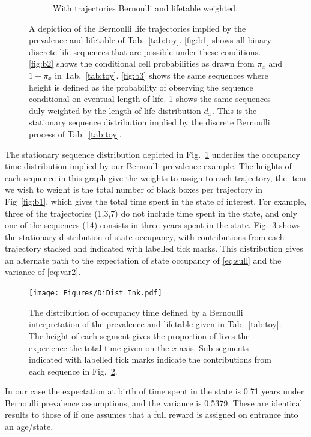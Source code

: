 \documentclass{bmcart}
\begin{document}
\begin{figure}
\begin{subfigure}[b]{0.4\textwidth}
        \caption{With trajectories Bernoulli and lifetable weighted.\\}
        \label{fig:b4}
    \end{subfigure}
    \caption{A depiction of the Bernoulli life trajectories implied by the prevalence and lifetable of Tab.~\ref{tab:toy}. \ref{fig:b1} shows all binary discrete life sequences that are possible under these conditions. \ref{fig:b2} shows the conditional cell probabilities as drawn from $\pi_x$ and $1-\pi_x$ in Tab.~\ref{tab:toy}. \ref{fig:b3} shows the same sequences where height is defined as the probability of observing the sequence conditional on eventual length of life. \ref{fig:b4} shows the same sequences duly weighted by the length of life distribution $d_x$. This is the stationary sequence distribution implied by the discrete Bernoulli process of Tab.~\ref{tab:toy}. }\label{fig:bernexplain}
\end{figure}

The stationary sequence distribution depicted in Fig.~\ref{fig:b4} underlies the occupancy time distribution implied by our Bernoulli prevalence example. The heights of each sequence in this graph give the weights to assign to each trajectory, the item we wish to weight is the total number of black boxes per trajectory in Fig~\ref{fig:b1}, which gives the total time spent in the state of interest. For example, three of the trajectories (1,3,7) do not include time spent in the state, and only one of the sequences (14) consists in three years spent in the state. Fig.~\ref{fig:DiDist} shows the stationary distribution of state occupancy, with contributions from each trajectory stacked and indicated with labelled tick marks. This distribution gives an alternate path to the expectation of state occupancy of \eqref{eq:sull} and the variance of \eqref{eq:var2}. 
\begin{figure}[ht!]
\centering
\texttt{[image: Figures/DiDist\_Ink.pdf]}
\caption{The distribution of occupancy time defined by a Bernoulli interpretation of the prevalence and lifetable given in Tab.~\ref{tab:toy}. The height of each segment gives the proportion of lives the experience the total time given on the $x$ axis. Sub-segments indicated with labelled tick marks indicate the contributions from each sequence in Fig.~\ref{fig:bernexplain}.}\label{fig:DiDist}
\end{figure}

In our case the expectation at birth of time spent in the state is 0.71 years under Bernoulli prevalence assumptions, and the variance is 0.5379. These are identical results to those of \cite{caswell2018matrix} if one assumes that a full reward is assigned on entrance into an age/state.
\end{document}
